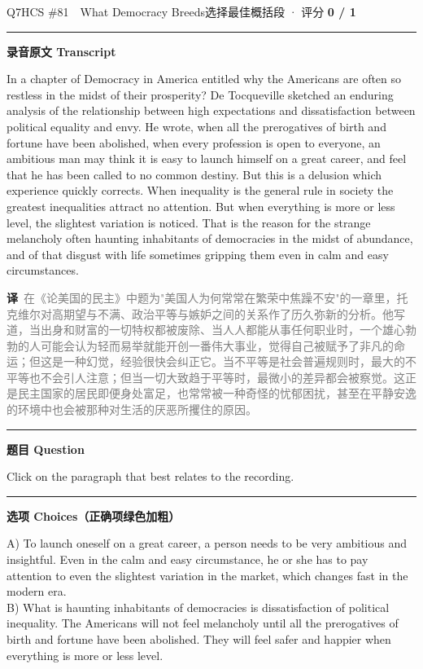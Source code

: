 \documentclass[11pt]{article}
\newcommand{\ptesub}[1]{%
  \par\needspace{2\baselineskip}\smallskip
  {\color{cAccent}\rule[-0.2ex]{3pt}{1.05em}}\hspace{6pt}%
  {\bfseries\color{cHead}#1}\par\nopagebreak\smallskip}
\newcommand{\zh}[1]{{\footnotesize\textcolor{cNote}{\textbf{译}}\ \textcolor{gray}{#1}}}
\begin{document}
\begin{qblock}{Q7\quad HCS \#81\ \ What Democracy Breeds}{选择最佳概括段 · 评分 \textcolor{cAccent}{\bfseries 0 / 1}}
\ptesub{录音原文 Transcript}
\begin{promptbox}
In a chapter of Democracy in America entitled why the Americans are often so restless in the midst of their prosperity? De Tocqueville sketched an enduring analysis of the relationship between high expectations and dissatisfaction between political equality and envy. He wrote, when all the prerogatives of birth and fortune have been abolished, when every profession is open to everyone, an ambitious man may think it is easy to launch himself on a great career, and feel that he has been called to no common destiny. But this is a delusion which experience quickly corrects. When inequality is the general rule in society the greatest inequalities attract no attention. But when everything is more or less level, the slightest variation is noticed. That is the reason for the strange melancholy often haunting inhabitants of democracies in the midst of abundance, and of that disgust with life sometimes gripping them even in calm and easy circumstances.
\end{promptbox}
\zh{在《论美国的民主》中题为"美国人为何常常在繁荣中焦躁不安"的一章里，托克维尔对高期望与不满、政治平等与嫉妒之间的关系作了历久弥新的分析。他写道，当出身和财富的一切特权都被废除、当人人都能从事任何职业时，一个雄心勃勃的人可能会认为轻而易举就能开创一番伟大事业，觉得自己被赋予了非凡的命运；但这是一种幻觉，经验很快会纠正它。当不平等是社会普遍规则时，最大的不平等也不会引人注意；但当一切大致趋于平等时，最微小的差异都会被察觉。这正是民主国家的居民即便身处富足，也常常被一种奇怪的忧郁困扰，甚至在平静安逸的环境中也会被那种对生活的厌恶所攫住的原因。}
\ptesub{题目 Question}
\begin{notebox}Click on the paragraph that best relates to the recording.\end{notebox}
\ptesub{选项 Choices（正确项绿色加粗）}
{\small
A) To launch oneself on a great career, a person needs to be very ambitious and insightful. Even in the calm and easy circumstance, he or she has to pay attention to even the slightest variation in the market, which changes fast in the modern era.\\
B) What is haunting inhabitants of democracies is dissatisfaction of political inequality. The Americans will not feel melancholy until all the prerogatives of birth and fortune have been abolished. They will feel safer and happier when everything is more or less level.\\
}
\end{qblock}
\end{document}
